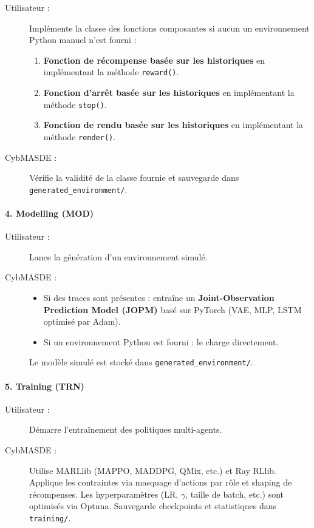 \begin{description}
  \item[Utilisateur :] Implémente la classe des fonctions composantes si aucun un environnement Python manuel n’est fourni :
    \begin{enumerate}
      \item \textbf{Fonction de récompense basée sur les historiques} en implémentant la méthode \texttt{reward()}.
      \item \textbf{Fonction d'arrêt basée sur les historiques} en implémentant la méthode \texttt{stop()}.
      \item \textbf{Fonction de rendu basée sur les historiques} en implémentant la méthode \texttt{render()}.
    \end{enumerate}
  \item[CybMASDE :] Vérifie la validité de la classe fournie et sauvegarde dans \texttt{generated\_environment/}.
\end{description}

\paragraph{4. Modelling (MOD)}
\begin{description}
  \item[Utilisateur :] Lance la génération d’un environnement simulé.
  \item[CybMASDE :]
    \begin{itemize}
      \item Si des traces sont présentes : entraîne un \textbf{Joint-Observation Prediction Model (JOPM)} basé sur PyTorch (VAE, MLP, LSTM optimisé par Adam).
      \item Si un environnement Python est fourni : le charge directement.
    \end{itemize}
    Le modèle simulé est stocké dans \texttt{generated\_environment/}.
\end{description}

\paragraph{5. Training (TRN)}
\begin{description}
  \item[Utilisateur :] Démarre l’entraînement des politiques multi-agents.
  \item[CybMASDE :] Utilise MARLlib (MAPPO, MADDPG, QMix, etc.) et Ray RLlib. Applique les contraintes  via masquage d’actions par rôle et shaping de récompenses. Les hyperparamètres (LR, $\gamma$, taille de batch, etc.) sont optimisés via Optuna. Sauvegarde checkpoints et statistiques dans \texttt{training/}.
\end{description}

